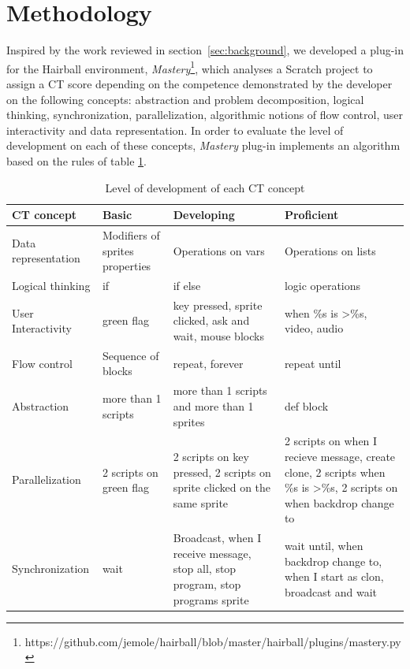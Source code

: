 \documentclass[a4paper,11pt]{article}
\begin{document}
\section{Methodology}
\label{sec:methodology}
Inspired by the work reviewed in section~\ref{sec:background}, we developed a plug-in for the Hairball environment, \textit{Mastery}\footnote{https://github.com/jemole/hairball/blob/master/hairball/plugins/mastery.py}, which analyses a Scratch project to assign a CT score depending on the competence demonstrated by the developer on the following concepts: abstraction and problem decomposition, logical thinking, synchronization, parallelization, algorithmic notions of flow control, user interactivity and data representation. In order to evaluate the level of development on each of these concepts, \textit{Mastery} plug-in implements an algorithm based on the rules of table \ref{table:CTscore}.
\begin{table}[t]
\centering
\caption{Level of development of each CT concept}
\begin{tabular}{p{2.5cm}p{2.7cm}p{3cm}p{4cm}}
\toprule
CT concept & Basic & Developing & Proficient\\ \midrule 
Data representation & Modifiers of sprites properties &
Operations on vars & Operations on lists  \\
Logical thinking & if & if else & logic operations \\ 
User Interactivity & green flag & key pressed, sprite clicked, ask and wait,
mouse blocks & when \%s is \textgreater \%s, video, audio \\ 
Flow control & Sequence of blocks & repeat, forever & repeat until \\ 
Abstraction & more than 1 scripts & more than 1 scripts and more than 1 sprites & def block\\ Parallelization & 2 scripts on green flag & 2 scripts on key pressed, 2 scripts on sprite clicked on the same sprite & 2 scripts on when I recieve message, create clone, 2 scripts when \%s is \textgreater \%s, 2 scripts on when backdrop change to \\
Synchronization & wait & Broadcast, when I receive message, stop all, stop program, stop programs sprite & wait until, when backdrop change to, when I start as clon, broadcast and wait \\ \bottomrule
\end{tabular}
\label{table:CTscore}
\end{table}
\end{document}

